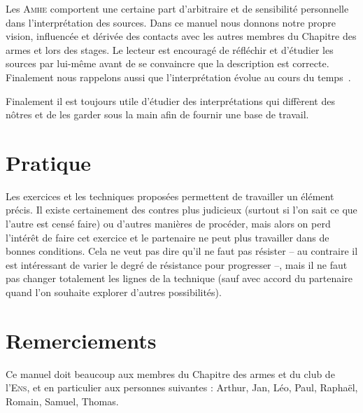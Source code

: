 Les \textsc{Amhe} comportent une certaine part d'arbitraire et de sensibilité personnelle dans l'interprétation des sources.
Dans ce manuel nous donnons notre propre vision, influencée et dérivée des contacts avec les autres membres du Chapitre des armes et lors des stages.
Le lecteur est encouragé de réfléchir et d'étudier les sources par lui-même avant de se convaincre que la description est correcte.
Finalement nous rappelons aussi que l'interprétation évolue au cours du temps~\footnotemark{}.

Finalement il est toujours utile d'étudier des interprétations qui diffèrent des nôtres et de les garder sous la main afin de fournir une base de travail.


\section{Pratique}


Les exercices et les techniques proposées permettent de travailler un élément précis.
Il existe certainement des contres plus judicieux (surtout si l'on sait ce que l'autre est censé faire) ou d'autres manières de procéder, mais alors on perd l'intérêt de faire cet exercice et le partenaire ne peut plus travailler dans de bonnes conditions.
Cela ne veut pas dire qu'il ne faut pas résister – au contraire il est intéressant de varier le degré de résistance pour progresser –, mais il ne faut pas changer totalement les lignes de la technique (sauf avec accord du partenaire quand l'on souhaite explorer d'autres possibilités).


\section{Remerciements}


Ce manuel doit beaucoup aux membres du Chapitre des armes et du club de l'\textsc{Ens}, et en particulier aux personnes suivantes : Arthur, Jan, Léo, Paul, Raphaël, Romain, Samuel, Thomas.
